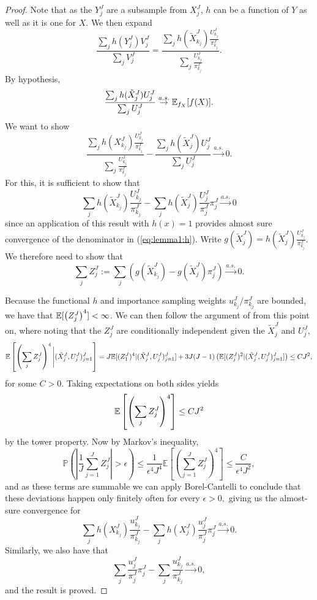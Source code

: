 \begin{proof}
    Note that as the $Y_j^J$ are a subsample from $X_j^J$, $h$ can be a function of $Y$ as well as it is one for $X$. We then expand
    $$\frac{\sum_j h(Y_j^J) V_j^J}{\sum_j V_j^J} = \frac{\sum_j h(\tilde X_{k_j}^J)\frac{U_{k_j}^J}{\pi_{k_j}^J}}{\sum_j \frac{U_{k_j}^J}{\pi_{k_j}^J}}.$$
    By hypothesis,
    $$\frac{\sum_j h(\tilde X_j^J)U_j^J}{\sum_j U_j^J} \stackrel{a.s.}{\to} \mathbb{E}_{f_X}[f(X)].$$
    We want to show
    \begin{equation}\label{eq:lemma1:h}
    \frac{\sum_j h(X_{k_j}^J)\frac{U_{k_j}^J}{\pi_{k_j}^J}}{\sum_j \frac{U_{k_j}^J}{\pi_{k_j}^J}} - \frac{\sum_j h(\tilde X_j^J)U_j^J}{\sum_j U_j^J} \stackrel{a.s.}{\to} 0.
    \end{equation}
    For this, it is sufficient to show that
   $$ \sum_j h(\tilde X_{k_j}^J)\frac{U_{k_j}^J}{\pi_{k_j}^J}
    -  \sum_j h(\tilde X_j^J)\frac{U_j^J}{\pi_j^J}\pi_j^J \stackrel{a.s.}{\to} 0 $$
    since an application of this result with $h(x)=1$ provides almost sure convergence of the denominator in (\ref{eq:lemma1:h}).
    Write $g(\tilde X_j^J) = h(\tilde X_j^J)\frac{U_{k_j}^J}{\pi_{k_j}^J}$. We therefore need to show that 
    $$\sum_j Z_j^J := \sum_j \left(g(\tilde X_{k_j}^J) -  g(\tilde X_j^J) \pi_j^J \right) \stackrel{a.s.}{\to} 0.$$

    Because the functional $h$ and importance sampling weights $u_{k_j}^J/\pi_{k_j}^J$ are bounded, we have that $\mathbb{E}[\left(Z_j^J\right)^4] < \infty$. We can then follow the argument of \cite{chopin20} from this point on, where noting that the $Z_j^J$ are conditionally independent given the $\tilde{X}_j^J$ and $U_j^J$,
    $$\mathbb{E}\left[\left(\sum_j Z_j^J\right)^4 \Bigg| (\tilde X_j^J,U_j^J)_{j=1}^J \right] 
    = J\mathbb{E}[(Z_1^J)^4|(\tilde X_j^J,U_j^J)_{j=1}^J] + 3J(J-1)\left(\mathbb{E}[(Z_j^J)^2|(\tilde X_j^J,U_j^J)_{j=1}^J]\right) \leq CJ^2,$$ for some $C>0$. Taking expectations on both sides yields
    $$\mathbb{E}\left[\left(\sum_j Z_j^J\right)^4 \right]  \leq CJ^2$$
    by the tower property. Now by Markov's inequality, 
    $$\mathbb{P}\left(\left|\frac{1}{J} \sum_{j=1}^J Z_j^J\right|>\epsilon \right) 
    \leq \frac{1}{\epsilon^4J^4 } 
    \mathbb{E}\left[\left(\sum_{j=1}^J Z_j^J\right)^4\right] \leq \frac{C}{\epsilon^4J^2},$$
    and as these terms are summable we can apply Borel-Cantelli to conclude that these deviations happen only finitely often for every $\epsilon>0,$ giving us the almost-sure convergence for   
    $$ \sum_j h(X_{k_j}^J)\frac{u_{k_j}^J}{\pi_{k_j}^J}
    -  \sum_j h(X_j^J)\frac{u_j^J}{\pi_j^J}\pi_j^J \stackrel{a.s.}{\to} 0.$$ 
    Similarly, we also have that
    $$ \sum_j \frac{u_j^J}{\pi_j^J}\pi_j^J
    - \sum_j \frac{u_{k_j}^J}{\pi_{k_j}^J} \stackrel{a.s.}{\to} 0,$$
    and the result is proved. 


\end{proof}
